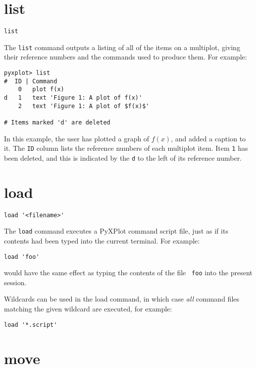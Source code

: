 \section{list}

\begin{verbatim}
list
\end{verbatim}

The {\tt list} command outputs a listing of all of the items on a multiplot,
giving their reference numbers and the commands used to produce them. For
example:

\begin{verbatim}
pyxplot> list
#  ID | Command 
    0   plot f(x) 
d   1   text 'Figure 1: A plot of f(x)' 
    2   text 'Figure 1: A plot of $f(x)$' 

# Items marked 'd' are deleted 
\end{verbatim}

In this example, the user has plotted a graph of $f(x)$, and added a caption to
it. The {\tt ID} column lists the reference numbers of each multiplot item.
Item {\tt 1} has been deleted, and this is indicated by the {\tt d} to the left
of its reference number.

\section{load}

\begin{verbatim}
load '<filename>'
\end{verbatim}

The {\tt load} command executes a PyXPlot command script file, just as if its
contents had been typed into the current terminal. For example:

\begin{verbatim}
load 'foo'
\end{verbatim}

\noindent would have the same effect as typing the contents of the file {\tt
foo} into the present session.

Wildcards can be used in the load command, in which case {\it all} command
files matching the given wildcard are executed, for example:

\begin{verbatim}
load '*.script'
\end{verbatim}

\section{move}

